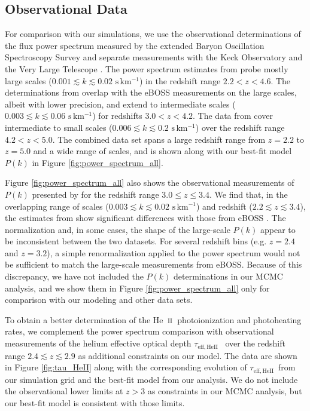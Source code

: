 \documentclass[twocolumn]{aastex62}
\def\HeII{\hbox{He~$\scriptstyle\rm II$}}
\newcommand\taueffHe{$\tau_{\mathrm{eff,HeII}}$~}
\begin{document}
\subsection{Observational Data}
\label{sec:observational_data}

For comparison with our simulations,
we use the observational determinations of the flux power spectrum measured by the extended 
Baryon Oscillation Spectroscopy Survey \citep[eBOSS;][]{Chabanier+2019} and separate measurements with the Keck Observatory and the Very Large Telescope 
\citep{Irsic+2017a, boera2019a}. 
The power spectrum estimates from \cite{Chabanier+2019} probe mostly large scales 
($ 0.001 \lesssim k \lesssim 0.02 \,\,\mathrm{s\,km^{-1}}$) in the redshift range $2.2 < z < 4.6$. The determinations from \cite{Irsic+2017a} overlap with 
the eBOSS measurements on the large scales,
albeit with lower precision,
and extend to intermediate scales ($ 0.003 \lesssim k \lesssim 0.06 \,\,\mathrm{s\,km^{-1}}$)
for redshifts $3.0 < z < 4.2$. 
The data from \cite{boera2019a} cover intermediate to small scales ($ 0.006 \lesssim k \lesssim 0.2 \,\,\mathrm{s\,km^{-1}}$) 
over the redshift range $4.2 < z < 5.0$. 
The combined data set spans a large redshift range from $z=2.2$ to $z=5.0$ and a wide range of scales, and is shown along with our best-fit model $P(k)$ in Figure \ref{fig:power_spectrum_all}.   

Figure
\ref{fig:power_spectrum_all} also shows
the observational measurements of $P(k)$ presented by \citet[][purple empty points]{walther2018a}
for the redshift range $3.0 \leq z \leq 3.4$.
We find that, in the overlapping range of scales ($0.003 \lesssim k \lesssim 0.02 \,\, \mathrm{s \, km^{-1}}$) and redshift 
($2.2 \lesssim z \lesssim 3.4$), the estimates from \cite{walther2018a} show significant differences with those  from eBOSS \citep{Chabanier+2019}.
The normalization and, in some cases, the shape of the large-scale $P(k)$ appear to be inconsistent between the two datasets. For several redshift bins 
(e.g. $z=2.4$ and $z=3.2$),
a simple renormalization applied to 
the \citet{walther2018a}
power spectrum  would not be sufficient to match the large-scale measurements from eBOSS. Because of this discrepancy, we have not included the \cite{walther2018a} $P(k)$ determinations in  our MCMC analysis, and we 
show them in 
Figure \ref{fig:power_spectrum_all} only for comparison with our modeling and other data sets.     

To obtain a better determination of the \HeII\ photoionization and photoheating rates, we complement the power spectrum comparison with observational 
measurements of the helium effective optical depth \taueffHe \citep{Worseck+2019} over the redshift range $2.4 \lesssim z \lesssim 2.9$  as additional constraints on our model. 
The data are shown in Figure \ref{fig:tau_HeII}
along with the corresponding evolution of \taueffHe from our simulation grid and the best-fit model from our analysis. We do not include the observational lower 
limits at $z>3$ as constraints in our MCMC analysis, but our best-fit model is consistent with those limits.
\end{document}
